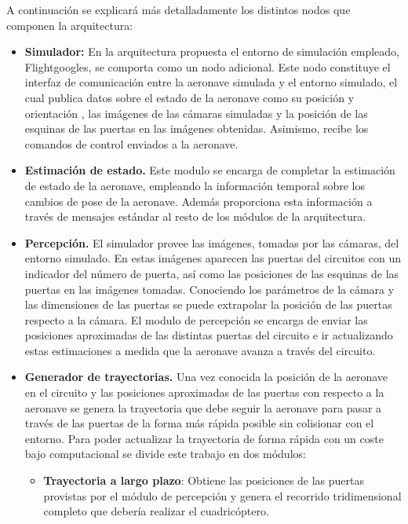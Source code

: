 A continuación se explicará más detalladamente los distintos nodos que componen la arquitectura:
\begin{itemize}
	
	\item \textbf{Simulador:} En la arquitectura propuesta el entorno de simulación empleado, Flightgoogles, se comporta como un nodo adicional. Este nodo constituye el interfaz de comunicación entre la aeronave simulada y el entorno simulado,
	el cual publica datos sobre el estado de la aeronave como su posición y orientación ,  las imágenes de las cámaras simuladas y la posición de las esquinas de las puertas en las imágenes obtenidas. Asimismo, recibe los comandos de control enviados a la aeronave.
	 
	\item \textbf{Estimación de estado.} Este modulo se encarga de completar la estimación de estado de la aeronave, empleando la información temporal sobre los cambios de pose de la aeronave. Además proporciona esta información a través de mensajes estándar al resto de los módulos de la arquitectura.
	
	\item \textbf{Percepción.} El simulador provee las imágenes, tomadas por las cámaras, del entorno simulado. En estas imágenes aparecen las puertas del circuitos con un indicador del número de puerta, así como las posiciones de las esquinas de las puertas en las imágenes tomadas. Conociendo los parámetros de la cámara y las dimensiones de las puertas se puede extrapolar la posición de las puertas respecto a la cámara. El modulo de percepción se encarga de enviar las posiciones aproximadas de las distintas puertas del circuito e ir actualizando estas estimaciones a medida que la aeronave avanza a través del circuito.
	
	\item \textbf{Generador de trayectorias.} Una vez conocida la posición de la aeronave en el circuito y las posiciones aproximadas de las puertas con respecto a la aeronave se genera la trayectoria que debe seguir la aeronave para pasar a través de las puertas de la forma más rápida posible sin colisionar con el entorno. Para poder actualizar la trayectoria de forma rápida con un coste bajo computacional se divide este trabajo en dos módulos:
	
	\begin{itemize}
		\item \textbf{Trayectoria a largo plazo}: Obtiene las posiciones de las puertas provistas por el módulo de percepción y genera el recorrido tridimensional completo que debería realizar el cuadricóptero. 
		

\end{itemize}
\end{itemize}
